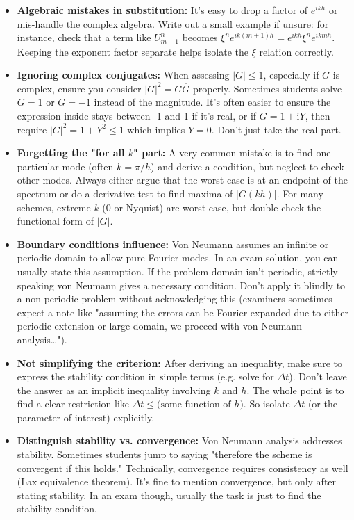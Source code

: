 \documentclass[a4paper,11pt]{article}
\begin{document}
\begin{itemize}
    \item \textbf{Algebraic mistakes in substitution:} It's easy to drop a factor of $e^{ikh}$ or mis-handle the complex algebra. Write out a small example if unsure: for instance, check that a term like $U^n_{m+1}$ becomes $\xi^n e^{ik(m+1)h} = e^{ikh} \xi^n e^{ikmh}$. Keeping the exponent factor separate helps isolate the $\xi$ relation correctly.

    \item \textbf{Ignoring complex conjugates:} When assessing $|G| \le 1$, especially if $G$ is complex, ensure you consider $|G|^2 = G \overline{G}$ properly. Sometimes students solve $G=1$ or $G=-1$ instead of the magnitude. It's often easier to ensure the expression inside stays between -1 and 1 if it's real, or if $G = 1 + \mathrm{i}Y$, then require $|G|^2 = 1 + Y^2 \le 1$ which implies $Y=0$. Don't just take the real part.

    \item \textbf{Forgetting the "for all $k$" part:} A very common mistake is to find one particular mode (often $k= \pi/h$) and derive a condition, but neglect to check other modes. Always either argue that the worst case is at an endpoint of the spectrum or do a derivative test to find maxima of $|G(kh)|$. For many schemes, extreme $k$ (0 or Nyquist) are worst-case, but double-check the functional form of $|G|$.

    \item \textbf{Boundary conditions influence:} Von Neumann assumes an infinite or periodic domain to allow pure Fourier modes. In an exam solution, you can usually state this assumption. If the problem domain isn't periodic, strictly speaking von Neumann gives a necessary condition. Don't apply it blindly to a non-periodic problem without acknowledging this (examiners sometimes expect a note like "assuming the errors can be Fourier-expanded due to either periodic extension or large domain, we proceed with von Neumann analysis…").

    \item \textbf{Not simplifying the criterion:} After deriving an inequality, make sure to express the stability condition in simple terms (e.g. solve for $\Delta t$). Don't leave the answer as an implicit inequality involving $k$ and $h$. The whole point is to find a clear restriction like $\Delta t \le \text{(some function of $h$)}$. So isolate $\Delta t$ (or the parameter of interest) explicitly.

    \item \textbf{Distinguish stability vs. convergence:} Von Neumann analysis addresses stability. Sometimes students jump to saying "therefore the scheme is convergent if this holds." Technically, convergence requires consistency as well (Lax equivalence theorem). It's fine to mention convergence, but only after stating stability. In an exam though, usually the task is just to find the stability condition.
\end{itemize}
\end{document}
